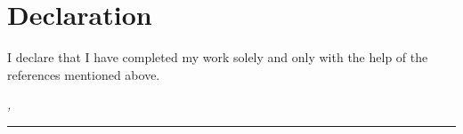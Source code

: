 
\chapter*{Declaration}
\thispagestyle{empty}

I declare that I have completed my work solely and only with the help of the references mentioned above.

\bigskip
\noindent\textit{\thesisUniversityCity, \thesisDate}

\smallskip
\begin{flushright}
	\begin{minipage}{5cm}
		\rule{\textwidth}{1pt}
		\centering\thesisName
	\end{minipage}
\end{flushright}
